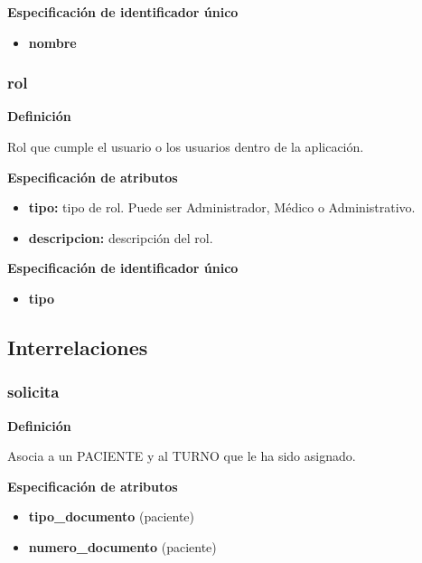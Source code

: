 \documentclass[a4paper,11pt]{article}
\begin{document}
\textbf{Especificación de identificador único}

\begin{itemize}

     \item \textbf{nombre}

\end{itemize}

\subsubsection{\textbf{rol}}

\textbf{Definición}

Rol que cumple el usuario o los usuarios dentro de la aplicación.

\textbf{Especificación de atributos}

\begin{itemize}

     \item \textbf{tipo:} tipo de rol. Puede ser Administrador, Médico o Administrativo. 
	 
     \item \textbf{descripcion:} descripción del rol. 

\end{itemize}

\textbf{Especificación de identificador único}

\begin{itemize}

     \item \textbf{tipo}

\end{itemize}



\subsection{\textbf{Interrelaciones}}

\subsubsection{\textbf{solicita}}

\textbf{Definición}

Asocia a un PACIENTE y al TURNO que le ha sido asignado.

\textbf{Especificación de atributos}

\begin{itemize}

     \item \textbf{tipo\_documento} (paciente)

     \item \textbf{numero\_documento} (paciente)


\end{itemize}
\end{document}
